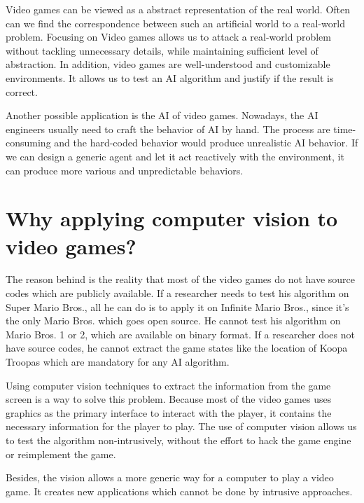 Video games can be viewed as a abstract representation of the real world. Often can we find the 
correspondence between such an artificial world to a real-world problem\cite{KeepAway}.
Focusing on Video games allows us to attack a real-world problem without tackling unnecessary details, while maintaining sufficient 
level of abstraction. In addition, video games are well-understood and customizable environments. 
It allows us to test an AI algorithm and justify if the result is correct\cite{Yavar}.

Another possible application is the AI of video games.
Nowadays, the AI engineers usually need to craft the behavior of AI by hand. 
The process are time-consuming and the hard-coded behavior would produce unrealistic AI behavior.
If we can design a generic agent and let it act reactively with the environment, it can produce 
more various and unpredictable behaviors.

\section{Why applying computer vision to video games?}

The reason behind is the reality that most of the video games do not have source codes which are publicly available.
If a researcher needs to test his algorithm on Super Mario Bros., all he can do is to apply it on Infinite Mario Bros.,
since it's the only Mario Bros. which goes open source. He cannot test his algorithm on Mario Bros. 1 or 2, which are available
on binary format. If a researcher does not have source codes, he cannot extract the game states like the location
of Koopa Troopas which are mandatory for any AI algorithm. 

Using computer vision techniques to extract the information from the game screen is a way to solve this problem.
Because most of the video games uses graphics as the primary interface to interact with the player, it contains
the necessary information for the player to play. The use of computer vision allows us to test the algorithm
non-intrusively, without the effort to hack the game engine or reimplement the game.

Besides, the vision allows a more generic way for a computer to play a video game. It creates 
new applications which cannot be done by intrusive approaches.

